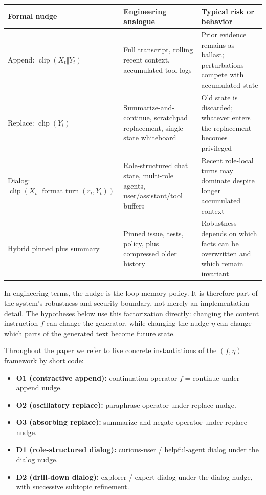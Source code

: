 \documentclass{article}
\theoremstyle{plain}
\theoremstyle{definition}
\begin{document}
\begin{table}[h!]
\centering
\small
\begin{tabularx}{\textwidth}{lYY}
\toprule
Formal nudge & Engineering analogue & Typical risk or behavior \\
\midrule
Append: \(\operatorname{clip}(X_t \Vert Y_t)\) & Full transcript, rolling recent context, accumulated tool logs & Prior evidence remains as ballast; perturbations compete with accumulated state \\
Replace: \(\operatorname{clip}(Y_t)\) & Summarize-and-continue, scratchpad replacement, single-state whiteboard & Old state is discarded; whatever enters the replacement becomes privileged \\
Dialog: \(\operatorname{clip}(X_t \Vert \operatorname{format\_turn}(r_t,Y_t))\) & Role-structured chat state, multi-role agents, user/assistant/tool buffers & Recent role-local turns may dominate despite longer accumulated context \\
Hybrid pinned plus summary & Pinned issue, tests, policy, plus compressed older history & Robustness depends on which facts can be overwritten and which remain invariant \\
\bottomrule
\end{tabularx}
\end{table}

In engineering terms, the nudge is the loop memory policy. It is therefore part of the system's robustness and security boundary, not merely an implementation detail. The hypotheses below use this factorization directly: changing the content instruction \(f\) can change the generator, while changing the nudge \(\eta\) can change which parts of the generated text become future state.

Throughout the paper we refer to five concrete instantiations of the $(f, \eta)$ framework by short code:

\begin{itemize}
  \item \textbf{O1 (contractive append):} continuation operator $f=\text{continue}$ under append nudge.
  \item \textbf{O2 (oscillatory replace):} paraphrase operator under replace nudge.
  \item \textbf{O3 (absorbing replace):} summarize-and-negate operator under replace nudge.
  \item \textbf{D1 (role-structured dialog):} curious-user / helpful-agent dialog under the dialog nudge.
  \item \textbf{D2 (drill-down dialog):} explorer / expert dialog under the dialog nudge, with successive subtopic refinement.
\end{itemize}
\end{document}
